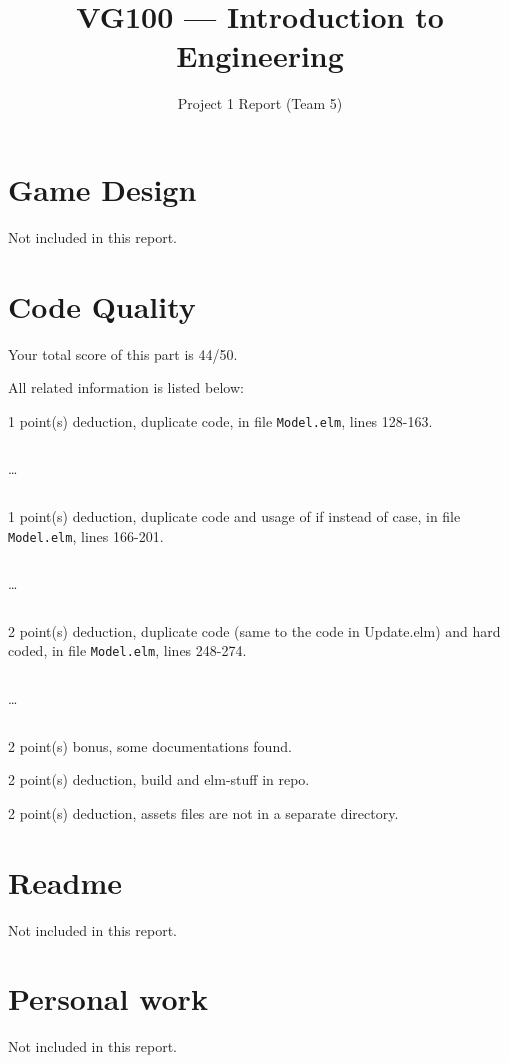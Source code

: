 \documentclass{article}
\title{VG100 --- Introduction to\\ Engineering}
\subtitle{Project 1 Report (Team 5)}
\begin{document}
\maketitle

\section{Game Design}

Not included in this report.

\section{Code Quality}

Your total score of this part is 44/50. \medskip

All related information is listed below: \medskip

1 point(s) {\color{red}deduction}, duplicate code, in file {\color{blue}\texttt{Model.elm}}, lines {\color{blue}128-163}.

\inputminted[firstline=128,lastline=137]{elm}{Model.elm}

\dots

\inputminted[firstline=154,lastline=163]{elm}{Model.elm}

1 point(s) {\color{red}deduction}, duplicate code and usage of if instead of case, in file {\color{blue}\texttt{Model.elm}}, lines {\color{blue}166-201}.

\inputminted[firstline=166,lastline=175]{elm}{Model.elm}

\dots

\inputminted[firstline=192,lastline=201]{elm}{Model.elm}

2 point(s) {\color{red}deduction}, duplicate code (same to the code in Update.elm) and hard coded, in file {\color{blue}\texttt{Model.elm}}, lines {\color{blue}248-274}.

\inputminted[firstline=248,lastline=257]{elm}{Model.elm}

\dots

\inputminted[firstline=265,lastline=274]{elm}{Model.elm}

2 point(s) {\color{red}bonus}, some documentations found.\medskip

2 point(s) {\color{red}deduction}, build and elm-stuff in repo.\medskip

2 point(s) {\color{red}deduction}, assets files are not in a separate directory.\medskip



\newpage

\section{Readme}

Not included in this report.

\section{Personal work}

Not included in this report.


\newpage
\end{document}

